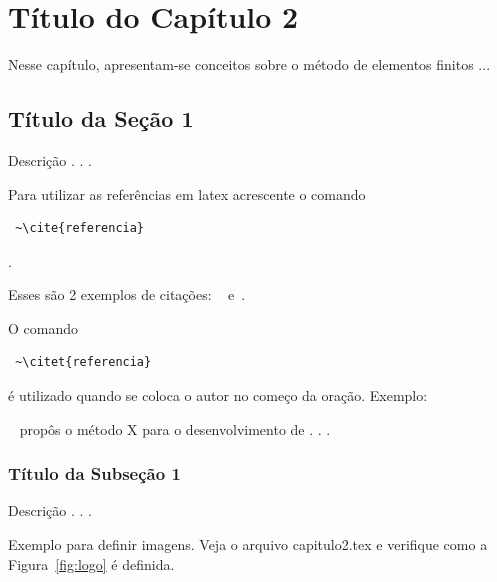 \pagestyle{empty}

\pagestyle{fancy}



\chapter{Título do Capítulo 2}\label{cap2}
Nesse capítulo, apresentam-se conceitos sobre o método de elementos finitos ...


\section{Título da Seção 1}\label{cap2:secao1}

Descrição . . .

Para utilizar as referências em latex acrescente o comando \begin{verbatim} ~\cite{referencia} 
\end{verbatim}.

Esses são 2 exemplos de citações: ~\cite{rylo2007} e~\cite{lima2008}.

O comando \begin{verbatim} ~\citet{referencia} \end{verbatim}

é utilizado quando se coloca o autor no começo da oração. Exemplo: 

~\citet{bittencourt2010} propôs o método X para o desenvolvimento de . . .

\subsection{Título da Subseção 1}\label{cap2:sub1}

Descrição . . .

Exemplo para definir imagens. Veja o arquivo capitulo2.tex e verifique como a 
Figura~\ref{fig:logo} é definida.

